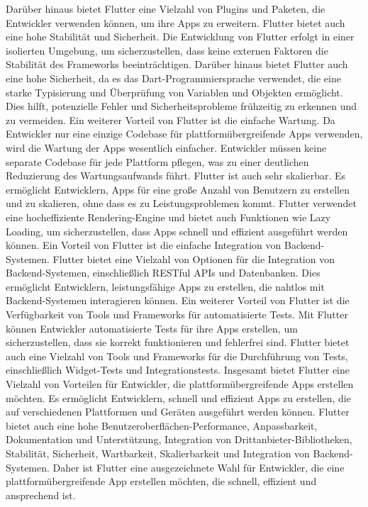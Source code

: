 Darüber hinaus bietet Flutter eine Vielzahl von Plugins und Paketen, die Entwickler verwenden können, um ihre Apps zu erweitern.
Flutter bietet auch eine hohe Stabilität und Sicherheit. Die Entwicklung von Flutter erfolgt in einer isolierten Umgebung, um sicherzustellen, dass keine externen Faktoren die Stabilität des Frameworks beeinträchtigen. 
Darüber hinaus bietet Flutter auch eine hohe Sicherheit, da es das Dart-Programmiersprache verwendet, die eine starke Typisierung und Überprüfung von Variablen und Objekten ermöglicht. 
Dies hilft, potenzielle Fehler und Sicherheitsprobleme frühzeitig zu erkennen und zu vermeiden.
Ein weiterer Vorteil von Flutter ist die einfache Wartung. 
Da Entwickler nur eine einzige Codebase für plattformübergreifende Apps verwenden, wird die Wartung der Apps wesentlich einfacher. 
Entwickler müssen keine separate Codebase für jede Plattform pflegen, was zu einer deutlichen Reduzierung des Wartungsaufwands führt.
Flutter ist auch sehr skalierbar. Es ermöglicht Entwicklern, Apps für eine große Anzahl von Benutzern zu erstellen und zu skalieren, ohne dass es zu Leistungsproblemen kommt. 
Flutter verwendet eine hocheffiziente Rendering-Engine und bietet auch Funktionen wie Lazy Loading, um sicherzustellen, dass Apps schnell und effizient ausgeführt werden können.
Ein Vorteil von Flutter ist die einfache Integration von Backend-Systemen. 
Flutter bietet eine Vielzahl von Optionen für die Integration von Backend-Systemen, einschließlich RESTful APIs und Datenbanken. 
Dies ermöglicht Entwicklern, leistungsfähige Apps zu erstellen, die nahtlos mit Backend-Systemen interagieren können.
Ein weiterer Vorteil von Flutter ist die Verfügbarkeit von Tools und Frameworks für automatisierte Tests. 
Mit Flutter können Entwickler automatisierte Tests für ihre Apps erstellen, um sicherzustellen, dass sie korrekt funktionieren und fehlerfrei sind. 
Flutter bietet auch eine Vielzahl von Tools und Frameworks für die Durchführung von Tests, einschließlich Widget-Tests und Integrationstests.
Insgesamt bietet Flutter eine Vielzahl von Vorteilen für Entwickler, die plattformübergreifende Apps erstellen möchten.
Es ermöglicht Entwicklern, schnell und effizient Apps zu erstellen, die auf verschiedenen Plattformen und Geräten ausgeführt werden können. 
\newline
Flutter bietet auch eine hohe Benutzeroberflächen-Performance, Anpassbarkeit,
\newline
Dokumentation und Unterstützung, Integration von Drittanbieter-Bibliotheken, Stabilität, Sicherheit, Wartbarkeit, Skalierbarkeit und Integration von Backend-Systemen. 
Daher ist Flutter eine ausgezeichnete Wahl für Entwickler, die eine plattformübergreifende App erstellen möchten, die schnell, effizient und ansprechend ist.
\cite{Flutter}
\newpage

